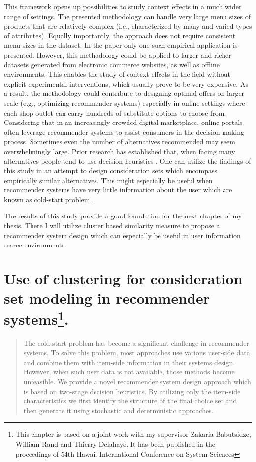 \documentclass[a4paper,12pt]{article}
\begin{document}
This framework opens up possibilities to study context effects in a much wider range of settings. The presented methodology can handle very large menu sizes of products that are relatively complex (i.e., characterized by many and varied types of attributes). Equally importantly, the approach does not require consistent menu sizes in the dataset. In the paper only one such empirical application is presented. However, this methodology could be applied to larger and richer datasets generated from electronic commerce websites, as well as offline environments. This enables the study of context effects in the field without explicit experimental interventions, which usually prove to be very expensive. As a result, the methodology could contribute to designing optimal offers on larger scale (e.g., optimizing recommender systems) especially in online settings where each shop outlet can carry hundreds of substitute options to choose from. Considering that in an increasingly crowded digital marketplace, online portals often leverage recommender systems to assist consumers in the decision-making process. Sometimes even the number of alternatives recommended may seem overwhelmingly large. Prior research has established that, when facing many alternatives people tend to use decision-heuristics \citep{fishburn1974exceptional}. One can utilize the findings of this study in an attempt to design consideration sets which encompass empirically similar alternatives. This might especially be useful when recommender systems have very little information about the user which are known as cold-start problem. 

The results of this study provide a good foundation for the next chapter of my thesis. There I will utilize cluster based similarity measure to propose a recommender system design which can especially be useful in user information scarce environments.




\newpage
\section{Use of clustering for consideration set modeling in recommender systems\footnote{This chapter is based on a joint work with my supervisor Zakaria Babutsidze, William Rand and Thierry Delahaye. It has been published in the proceedings of 54th Hawaii International Conference on System Sciences}.}\label{chapter:hicssPaper}

\begin{abstract}
        The cold-start problem has become a significant challenge in recommender systems. To solve this problem, most approaches use various user-side data  and combine them with item-side information in their systems design. However, when such user data is not available, those methods become unfeasible. We provide a novel recommender system design approach which is based on two-stage decision heuristics. By utilizing only the item-side characteristics we first identify the structure of the final choice set and then generate it using stochastic and deterministic approaches.
        
\end{abstract}
\end{document}
